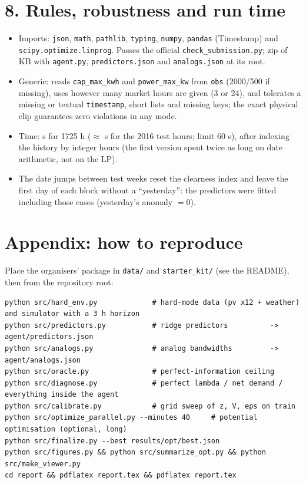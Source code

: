 \documentclass[11pt,a4paper]{article}
\begin{document}
\section*{8. Rules, robustness and run time}
\begin{itemize}
  \item Imports: \texttt{json}, \texttt{math}, \texttt{pathlib}, \texttt{typing}, \texttt{numpy}, \texttt{pandas} (Timestamp) and \texttt{scipy.optimize.linprog}. Passes the official \texttt{check\_submission.py}; zip of \zipKB{} KB with \texttt{agent.py}, \texttt{predictors.json} and \texttt{analogs.json} at its root.
  \item Generic: reads \texttt{cap\_max\_kwh} and \texttt{power\_max\_kw} from \texttt{obs} (2000/500 if missing), uses however many market hours are given (3 or 24), and tolerates a missing or textual \texttt{timestamp}, short lists and missing keys; the exact physical clip guarantees zero violations in any mode.
  \item Time: \timeFinal{} s for 1725 h ($\approx$\timeExtrap{} s for the 2016 test hours; limit 60 s), after indexing the history by integer hours (the first version spent twice as long on date arithmetic, not on the LP).
  \item The date jumps between test weeks reset the clearness index and leave the first day of each block without a ``yesterday'': the predictors were fitted including those cases (yesterday's anomaly $=0$).
\end{itemize}

\section*{Appendix: how to reproduce}
Place the organisers' package in \texttt{data/} and \texttt{starter\_kit/} (see the README), then from the repository root:
{\footnotesize\begin{verbatim}
python src/hard_env.py             # hard-mode data (pv x12 + weather) and simulator with a 3 h horizon
python src/predictors.py           # ridge predictors          -> agent/predictors.json
python src/analogs.py              # analog bandwidths         -> agent/analogs.json
python src/oracle.py               # perfect-information ceiling
python src/diagnose.py             # perfect lambda / net demand / everything inside the agent
python src/calibrate.py            # grid sweep of z, V, eps on train
python src/optimize_parallel.py --minutes 40     # potential optimisation (optional, long)
python src/finalize.py --best results/opt/best.json
python src/figures.py && python src/summarize_opt.py && python src/make_viewer.py
cd report && pdflatex report.tex && pdflatex report.tex
\end{verbatim}}
\end{document}
